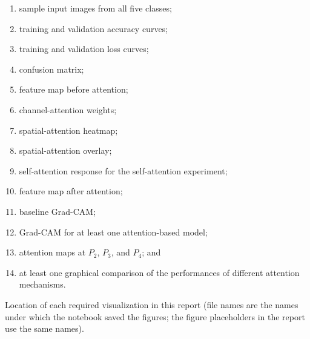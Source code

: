 \documentclass[10pt]{article}
\begin{document}
\begin{enumerate}

\item sample input images from all five classes;

\item training and validation accuracy curves;

\item training and validation loss curves;

\item confusion matrix;

\item feature map before attention;

\item channel-attention weights;

\item spatial-attention heatmap;

\item spatial-attention overlay;

\item self-attention response for the self-attention experiment;

\item feature map after attention;

\item baseline Grad-CAM;

\item Grad-CAM for at least one attention-based model;

\item attention maps at $P_2$, $P_3$, and $P_4$; and

\item at least one graphical comparison of the performances of different
attention mechanisms.

\end{enumerate}


Location of each required visualization in this report (file names are the names under which the notebook saved the figures; the figure placeholders in the report use the same names).
\end{document}
